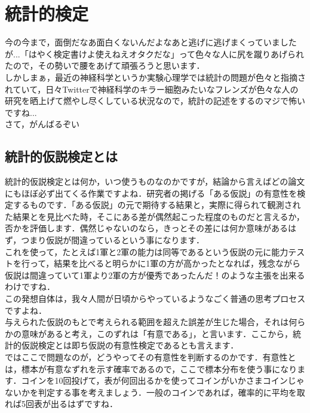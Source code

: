\documentclass[11pt,a4paper]{ujreport} 	%
\begin{document}
\chapter{統計的検定}
今の今まで，面倒だなあ面白くないんだよなあと逃げに逃げまくっていましたが...「はやく検定書けよ使えねえオタクだな」って色々な人に尻を蹴りあげられたので，その勢いで腰をあげて頑張ろうと思います．\\

しかしまぁ，最近の神経科学というか実験心理学では統計の問題が色々と指摘されていて，日々Twitterで神経科学のキラー細胞みたいなフレンズが色々な人の研究を晒上げて燃やし尽くしている状況なので，統計の記述をするのマジで怖いですね...\\


さて，がんばるぞい\\

\section{統計的仮説検定とは}
統計的仮説検定とは何か，いつ使うものなのかですが，結論から言えばどの論文にもほぼ必ず出てくる作業ですよね．研究者の掲げる「ある仮説」の有意性を検定するものです．「ある仮説」の元で期待する結果と，実際に得られて観測された結果とを見比べた時，そこにある差が偶然起こった程度のものだと言えるか，否かを評価します．偶然じゃないのなら，きっとその差には何か意味があるはず，つまり仮説が間違っているという事になります．\\

これを使って，たとえば1軍と2軍の能力は同等であるという仮説の元に能力テストを行って，結果を比べると明らかに1軍の方が高かったとなれば，残念ながら仮説は間違っていて1軍より2軍の方が優秀であったんだ！のような主張を出来るわけですね．\\

この発想自体は，我々人間が日頃からやっているようなごく普通の思考プロセスですよね．\\

与えられた仮説のもとで考えられる範囲を超えた誤差が生じた場合，それは何らかの意味があると考え，このずれは「有意である」，と言います．ここから，統計的仮説検定とは即ち仮説の有意性検定であるとも言えます．\\

ではここで問題なのが，どうやってその有意性を判断するのかです．有意性とは，標本が有意なずれを示す確率であるので，ここで標本分布を使う事になります．コインを10回投げて，表が何回出るかを使ってコインがいかさまコインじゃないかを判定する事を考えましょう．一般のコインであれば，確率的に平均を取れば5回表が出るはずですね．
\end{document}
